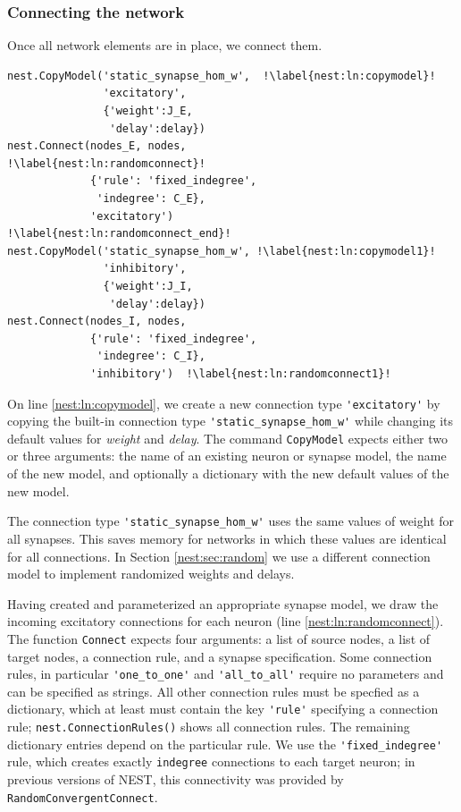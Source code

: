 \documentclass{article}
\begin{document}
\subsubsection{Connecting the network}

Once all network elements are in place, we connect them.

\begin{lstlisting}[name=Brunel_interactive] 
nest.CopyModel('static_synapse_hom_w',  !\label{nest:ln:copymodel}!
               'excitatory',
               {'weight':J_E, 
                'delay':delay})
nest.Connect(nodes_E, nodes,            !\label{nest:ln:randomconnect}!
             {'rule': 'fixed_indegree', 
              'indegree': C_E},
             'excitatory')             !\label{nest:ln:randomconnect_end}!
nest.CopyModel('static_synapse_hom_w', !\label{nest:ln:copymodel1}!
               'inhibitory',
               {'weight':J_I, 
                'delay':delay})
nest.Connect(nodes_I, nodes,
             {'rule': 'fixed_indegree', 
              'indegree': C_I},
             'inhibitory')  !\label{nest:ln:randomconnect1}!
\end{lstlisting} 

On line \ref{nest:ln:copymodel}, we create a new connection
type \lstinline!'excitatory'! by copying the built-in connection type
\lstinline!'static_synapse_hom_w'! while changing its default values
for \emph{weight} and \emph{delay}. The command \lstinline!CopyModel!
expects either two or three arguments: the name of an existing neuron
or synapse model, the name of the new model, and optionally a
dictionary with the new default values of the new model.

The connection type \lstinline!'static_synapse_hom_w'! uses the same
values of weight for all synapses. This saves memory for
networks in which these values are identical for all connections. In
Section \ref{nest:sec:random} we use a different connection model to
implement randomized weights and delays.

Having created and parameterized an appropriate synapse model, we draw
the incoming excitatory connections for each neuron (line
\ref{nest:ln:randomconnect}). The function
\lstinline!Connect!  expects four arguments: a list of
source nodes, a list of target nodes, a connection rule, and a synapse
specification. Some connection rules, in particular
\lstinline!'one_to_one'! and \lstinline!'all_to_all'! require no
parameters and can be specified as strings. All other connection rules
must be specfied as a dictionary, which at least must contain the key
\lstinline!'rule'! specifying a connection rule;
\lstinline!nest.ConnectionRules()! shows all connection rules. The
remaining dictionary entries depend on the particular rule. We use the
\lstinline!'fixed_indegree'! rule, which creates exactly
\lstinline!indegree! connections to each target neuron; in previous
versions of NEST, this connectivity was provided by
\lstinline!RandomConvergentConnect!. 
\end{document}
